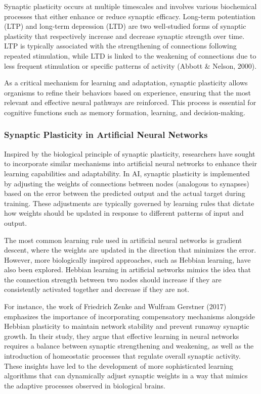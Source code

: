 \documentclass[12pt,twoside]{article}
\begin{document}
Synaptic plasticity occurs at multiple timescales and involves various biochemical processes that either enhance or reduce synaptic efficacy. Long-term potentiation (LTP) and long-term depression (LTD) are two well-studied forms of synaptic plasticity that respectively increase and decrease synaptic strength over time. LTP is typically associated with the strengthening of connections following repeated stimulation, while LTD is linked to the weakening of connections due to less frequent stimulation or specific patterns of activity (Abbott & Nelson, 2000).

As a critical mechanism for learning and adaptation, synaptic plasticity allows organisms to refine their behaviors based on experience, ensuring that the most relevant and effective neural pathways are reinforced. This process is essential for cognitive functions such as memory formation, learning, and decision-making.

\subsubsection{Synaptic Plasticity in Artificial Neural Networks}

Inspired by the biological principle of synaptic plasticity, researchers have sought to incorporate similar mechanisms into artificial neural networks to enhance their learning capabilities and adaptability. In AI, synaptic plasticity is implemented by adjusting the weights of connections between nodes (analogous to synapses) based on the error between the predicted output and the actual target during training. These adjustments are typically governed by learning rules that dictate how weights should be updated in response to different patterns of input and output.

The most common learning rule used in artificial neural networks is gradient descent, where the weights are updated in the direction that minimizes the error. However, more biologically inspired approaches, such as Hebbian learning, have also been explored. Hebbian learning in artificial networks mimics the idea that the connection strength between two nodes should increase if they are consistently activated together and decrease if they are not.

For instance, the work of Friedrich Zenke and Wulfram Gerstner (2017) emphasizes the importance of incorporating compensatory mechanisms alongside Hebbian plasticity to maintain network stability and prevent runaway synaptic growth. In their study, they argue that effective learning in neural networks requires a balance between synaptic strengthening and weakening, as well as the introduction of homeostatic processes that regulate overall synaptic activity. These insights have led to the development of more sophisticated learning algorithms that can dynamically adjust synaptic weights in a way that mimics the adaptive processes observed in biological brains.
\end{document}
